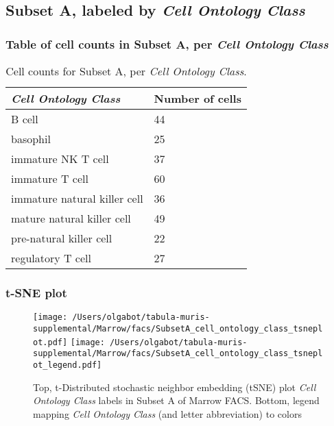 \clearpage

\subsection{Subset A, labeled by \emph{Cell Ontology Class}}
\subsubsection{Table of cell counts in Subset A, per \emph{Cell Ontology Class}}\begin{table}[h]
\centering
\label{my-label}
\begin{tabular}{@{}ll@{}}
\toprule

\emph{Cell Ontology Class}& Number of cells \\ \midrule
B cell & 44 \\

basophil & 25 \\

immature NK T cell & 37 \\

immature T cell & 60 \\

immature natural killer cell & 36 \\

mature natural killer cell & 49 \\

pre-natural killer cell & 22 \\

regulatory T cell & 27 \\
\bottomrule
\end{tabular}
\caption{Cell counts for Subset A, per \emph{Cell Ontology Class}.}
\end{table}

\clearpage
\subsubsection{t-SNE plot}
\begin{figure}[h]
\centering
\texttt{[image: /Users/olgabot/tabula-muris-supplemental/Marrow/facs/SubsetA\_cell\_ontology\_class\_tsneplot.pdf]}
\texttt{[image: /Users/olgabot/tabula-muris-supplemental/Marrow/facs/SubsetA\_cell\_ontology\_class\_tsneplot\_legend.pdf]}
\caption{Top, t-Distributed stochastic neighbor embedding (tSNE) plot  \emph{Cell Ontology Class} labels in Subset A of Marrow FACS. Bottom, legend mapping \emph{Cell Ontology Class} (and letter abbreviation) to colors}
\end{figure}


